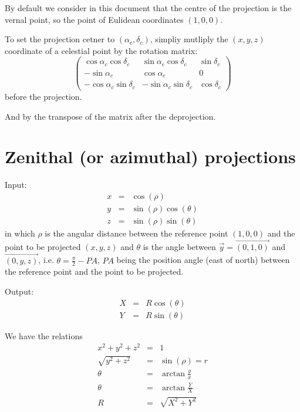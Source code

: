 \documentclass[a4paper,twoside,11pt]{article}
\begin{document}
    By default we consider in this document that the centre of the projection
    is the vernal point, so the point of Eulidean coordinates $(1, 0, 0)$.

    To set the projection cetner to $(\alpha_c, \delta_c)$, simpliy mutliply the $(x, y, z)$
    coordinate of a celestial point by the rotation matrix:
    \begin{equation*}
      \begin{pmatrix}
        \cos\alpha_c\cos\delta_c &  \sin\alpha_c\cos\delta_c & \sin\delta_c\\
       -\sin\alpha_c             &  \cos\alpha_c             & 0 \\
       -\cos\alpha_c\sin\delta_c & -\sin\alpha_c\sin\delta_c & \cos\delta_c
      \end{pmatrix}
    \end{equation*}
    before the projection.

    And by the transpose of the matrix after the deprojection.

\section{Zenithal (or azimuthal) projections}

  Input:
  \begin{eqnarray}
    x & = & \cos(\rho) \label{eq:zen.x} \\
    y & = & \sin(\rho) \cos(\theta) \label{eq:zen.y} \\
    z & = & \sin(\rho) \sin(\theta) \label{eq:zen.z}
  \end{eqnarray}
  in which $\rho$ is the angular distance between the reference point $(1, 0, 0)$
  and the point to be projected $(x, y, z)$ and $\theta$ is the angle between
  $\vec{y} = \vec{(0, 1, 0)}$ and $\vec{(0, y, z)}$, i.e. $\theta=\frac{\pi}{2} - PA$, $PA$
  being the position angle (east of north) between the reference point and the point
  to be projected.

  Output:
  \begin{eqnarray}
    X & = & R \cos(\theta) \label{eq:zenithal.X} \\
    Y & = & R \sin(\theta) \label{eq:zenithal.Y}
  \end{eqnarray}
  
  We have the relations
  \begin{eqnarray}
    x^2 + y^2 + z^2  & = & 1 \\
    \sqrt{y^2 + z^2} & = & \sin(\rho) = r \\
              \theta & = & \arctan{\frac{y}{x}} \\
	      \theta & = & \arctan{\frac{Y}{X}} \\
                   R & = & \sqrt{X^2 + Y^2}
  \end{eqnarray}
\end{document}
